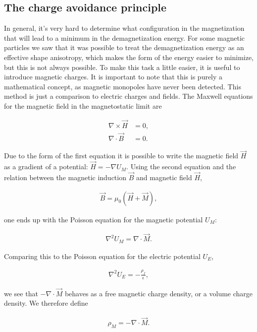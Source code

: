 \documentclass[1p]{elsarticle}		%
\numberwithin{equation}{section}
\begin{document}
\subsection{The charge avoidance principle}
In general, it's very hard to determine what configuration in the magnetization that will lead to a minimum in the demagnetization energy. For some magnetic particles we saw that it was possible to treat the demagnetization energy as an effective shape anisotropy, which makes the form of the energy easier to minimize, but this is not always possible. To make this task a little easier, it is useful to introduce magnetic charges. It is important to note that this is purely a mathematical concept, as magnetic monopoles have never been detected. This method is just a comparison to electric charges and fields. The Maxwell equations for the magnetic field in the magnetostatic limit are

\begin{align}
\nabla \times \vec{H} &= 0, \\
\nabla \cdot \vec{B} &= 0.
\end{align}

Due to the form of the first equation it is possible to write the magnetic field $\vec{H}$ as a gradient of a potential: $\vec{H} = -\nabla U_M$. Using the second equation and the relation between the magnetic induction $\vec{B}$ and magnetic field $\vec{H}$, 

\begin{align}
\vec{B} = \mu_0(\vec{H}+\vec{M}),
\end{align}

one ends up with the Poisson equation for the magnetic potential $U_M$:

\begin{align}
\nabla^2 U_M = \nabla \cdot \vec{M}.
\end{align}

Comparing this to the Poisson equation for the electric potential $U_E$,

\begin{align}
\nabla^2 U_E = -\frac{\rho_f}{\epsilon},
\end{align}

we see that $-\nabla \cdot \vec{M}$ behaves as a free magnetic charge density, or a volume charge density. We therefore define

\begin{align}
\label{eq:magchargedensity}
\rho_M = - \nabla \cdot \vec{M}.
\end{align}
\end{document}
